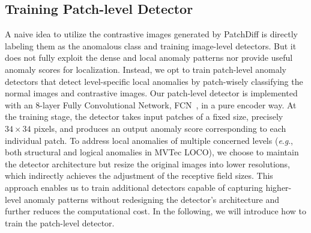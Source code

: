 \documentclass[letterpaper]{article} %
\newcommand{\eg}{\textit{e}.\textit{g}.}
\begin{document}
\subsection{Training Patch-level Detector}
\label{sec: training}
A naive idea to utilize the contrastive images generated by PatchDiff is directly labeling them as the anomalous class and training image-level detectors. But it does not fully exploit the dense and local anomaly patterns nor provide useful anomaly scores for localization. Instead, we opt to train patch-level anomaly detectors that detect level-specific local anomalies by patch-wisely classifying the normal images and contrastive images. 
Our patch-level detector is implemented with an 8-layer Fully Convolutional Network, FCN~\cite{FCN}, in a pure encoder way. At the training stage, the detector takes input patches of a fixed size, precisely $34 \times 34$ pixels, and produces an output anomaly score corresponding to each individual patch. To address local anomalies of multiple concerned levels (\eg, both structural and logical anomalies in MVTec LOCO), we choose to maintain the detector architecture but resize the original images into lower resolutions, which indirectly achieves the adjustment of the receptive field sizes. This approach enables us to train additional detectors capable of capturing higher-level anomaly patterns without redesigning the detector's architecture and further reduces the computational cost. In the following, we will introduce how to train the patch-level detector.
\end{document}
